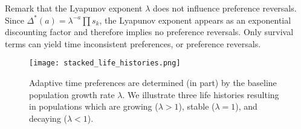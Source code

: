 \documentclass[titlepage, hidelinks, 12pt]{article}
\theoremstyle{plain}
\theoremstyle{remark}
\theoremstyle{definition}
\DeclareMathOperator{\smallersooner}{SS}
\DeclareMathOperator{\largerlater}{LL}
\begin{document}
Remark that the Lyapunov exponent $\lambda$ does not influence preference reversals. Since $\Delta^*(a) = \lambda^{-a} \prod s_k$, the Lyapunov
exponent appears as an exponential discounting factor and therefore implies no preference reversals. Only survival terms can yield  
time inconsistent preferences, or preference reversals. 








\begin{figure}[H]
    \centering
    \texttt{[image: stacked\_life\_histories.png]}
    \caption[Life histories giving decaying, stable, and growing populations.]{Adaptive time preferences are determined (in part) by the baseline population growth rate $\lambda$. 
        We illustrate three life histories resulting in populations which are
        growing ($\lambda > 1$), stable ($\lambda = 1$), and decaying ($\lambda < 1$).}
\end{figure}
\newpage
\end{document}
